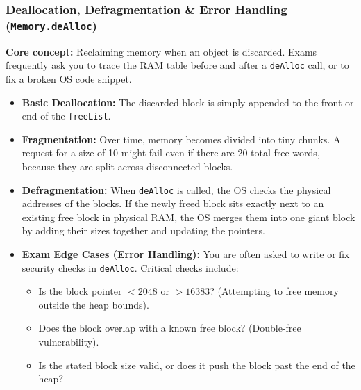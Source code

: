 \documentclass[12pt,a4paper]{article}
\begin{document}
\subsubsection*{Deallocation, Defragmentation \& Error Handling (\texttt{Memory.deAlloc})}
\textbf{Core concept:} Reclaiming memory when an object is discarded. Exams frequently ask you to trace the RAM table before and after a \texttt{deAlloc} call, or to fix a broken OS code snippet.
\begin{itemize}
    \item \textbf{Basic Deallocation:} The discarded block is simply appended to the front or end of the \texttt{freeList}.
    \item \textbf{Fragmentation:} Over time, memory becomes divided into tiny chunks. A request for a size of 10 might fail even if there are 20 total free words, because they are split across disconnected blocks.
    \item \textbf{Defragmentation:} When \texttt{deAlloc} is called, the OS checks the physical addresses of the blocks. If the newly freed block sits exactly next to an existing free block in physical RAM, the OS merges them into one giant block by adding their sizes together and updating the pointers.
    \item \textbf{Exam Edge Cases (Error Handling):} You are often asked to write or fix security checks in \texttt{deAlloc}. Critical checks include:
    \begin{itemize}
        \item Is the block pointer $< 2048$ or $> 16383$? (Attempting to free memory outside the heap bounds).
        \item Does the block overlap with a known free block? (Double-free vulnerability).
        \item Is the stated block size valid, or does it push the block past the end of the heap?
    \end{itemize}
\end{itemize}
\end{document}
